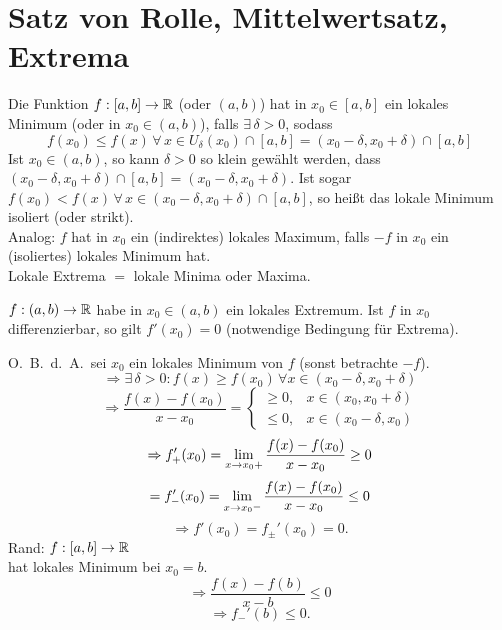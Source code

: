 \documentclass[../ana1.tex]{subfiles}
\begin{document}
\setcounter{section}{18}
\section{Satz von Rolle, Mittelwertsatz, Extrema}
\begin{defi}
    Die Funktion \( f : [a,b] \rightarrow \mathbb{R} \) (oder \( (a,b) \))
    hat in \( x_0 \in [a,b] \) ein lokales Minimum (oder in 
    \( x_0 \in (a,b) \)), falls \( \exists \, \delta > 0 \), 
    sodass 
    \[ f(x_0) \leq f(x) \, \forall \, x \in U_\delta(x_0)
    \cap [a,b] = (x_0 - \delta, x_0 + \delta) \cap [a,b] \]
    Ist \( x_0 \in (a,b) \), so kann \( \delta > 0 \) so klein 
    gewählt werden, dass \( (x_0 - \delta, x_0 + \delta) 
    \cap [a,b] = (x_0 - \delta, x_0 + \delta) \).
    Ist sogar \( f(x_0) < f(x) \,\forall \, x \in 
    (x_0 - \delta, x_0 + \delta) \cap [a,b] \), so heißt 
    das lokale Minimum isoliert (oder strikt).\\
    Analog: \( f \) hat in \( x_0 \) ein (indirektes) lokales 
    Maximum, falls \(-f\) in \(x_0\) ein (isoliertes) lokales 
    Minimum hat.\\
    Lokale Extrema \(=\) lokale Minima oder Maxima.
\end{defi}
\begin{satz}
    \( f: (a,b) \rightarrow \mathbb{R} \) habe in \(x_0 \in (a,b) \) 
    ein lokales Extremum. Ist \(f\) in \(x_0\) differenzierbar, 
    so gilt \( f'(x_0) = 0 \) (notwendige Bedingung für Extrema).
\end{satz}
\begin{bew}
    O.\ B.\ d.\ A.\ sei \(x_0\) ein lokales Minimum von \(f\) 
    (sonst betrachte \(-f\)).
    \[ \Rightarrow \exists \, \delta > 0 : f(x) \geq f(x_0) 
    \,\forall x \in (x_0 - \delta, x_0 + \delta) \]
    \[ \Rightarrow \frac{f(x) - f(x_0)}{x - x_0} = \begin{cases}
        \geq 0, &x \in (x_0, x_0 + \delta)\\
        \leq 0, &x \in (x_0 - \delta, x_0)
    \end{cases} \]
    \[ \Rightarrow f_+'(x_0) = \lim\limits_{x\rightarrow x_0 +} 
    \frac{ f(x) - f(x_0) }{ x - x_0 } \geq 0 \]
    \[ = f_{\minus}'(x_0) = \limesx{x}{x_0 \minus} 
    \frac{ f(x) - f(x_0) }{ x - x_0 } \leq 0 \]
    \[ \Rightarrow f'(x_0) = f_{\pm}'(x_0) = 0. \]
    Rand: \(f: [a,b] \rightarrow \mathbb{R} \) \\
    hat lokales Minimum bei \( x_0 = b \).
    \[ \Rightarrow \frac{ f(x) - f(b) }{ x - b } \leq 0 \]
    \[ \Rightarrow f_{\minus}'(b) \leq 0. \]
\end{bew}
\end{document}
